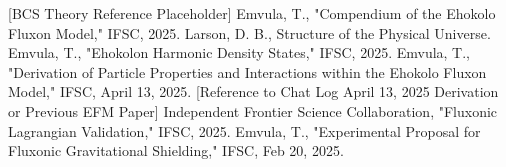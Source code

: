 \documentclass[a4paper,12pt]{article}
\begin{document}

\begin{thebibliography}{99}
     [BCS Theory Reference Placeholder]
     Emvula, T., "Compendium of the Ehokolo Fluxon Model," IFSC, 2025.
     Larson, D. B., Structure of the Physical Universe.
     Emvula, T., "Ehokolon Harmonic Density States," IFSC, 2025.
     Emvula, T., "Derivation of Particle Properties and Interactions within the Ehokolo Fluxon Model," IFSC, April 13, 2025.
     [Reference to Chat Log April 13, 2025 Derivation or Previous EFM Paper] %
     Independent Frontier Science Collaboration, "Fluxonic Lagrangian Validation," IFSC, 2025.
     Emvula, T., "Experimental Proposal for Fluxonic Gravitational Shielding," IFSC, Feb 20, 2025.

\end{thebibliography}
\end{document}
